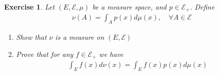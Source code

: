 \documentclass[12pt]{article}
\theoremstyle{colon}
\newtheorem{exercise}{Exercise}
\begin{document}
\clearpage

\begin{exercise}
  Let $(E, \mathcal{E}, \mu)$ be a measure space, and $p \in \mathcal{E}_+$. Define
  \begin{gather*}
    \nu (A) = \int_A p(x) d\mu(x), \quad \forall A \in \mathcal{E}
  \end{gather*}
  \begin{enumerate}[label=\alph*)]
    \item Show that $\nu$ is a measure on $(E, \mathcal{E})$
    \item Prove that for any $f \in \mathcal{E}_+$ we have
      \begin{gather*}
        \int_E f(x) d\nu(x) = \int_E f(x)p(x) d\mu(x)
      \end{gather*}
  \end{enumerate}
\end{exercise}
\end{document}
